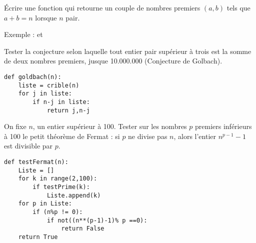\begin{Exercise}
Écrire une fonction  qui retourne un couple de nombres premiers $(a,b)$ tels que $a+b=n$ lorsque $n$ pair. %

Exemple  :   et 

Tester la conjecture selon laquelle tout entier pair supérieur à trois est la somme de deux nombres premiers, jusque 10.000.000 (Conjecture de Golbach). 
\end{Exercise}
\begin{Answer}
\begin{lstlisting}
def goldbach(n):
    liste = crible(n)
    for j in liste:
        if n-j in liste:
            return j,n-j
\end{lstlisting}
\end{Answer}
\begin{Exercise}
On fixe $n$, un entier supérieur à 100. 
Tester sur les nombres $p$ premiers inférieurs à 100 le petit théorème de Fermat : si $p$ ne divise pas $n$, alors  l'entier $ n^{p-1}-1$ est divisible par $p$.
\end{Exercise}
\begin{Answer}
\begin{lstlisting}
def testFermat(n):
    Liste = []
    for k in range(2,100):
        if testPrime(k):
            Liste.append(k)
    for p in Liste:
        if (n%p != 0):
            if not((n**(p-1)-1)% p ==0):
                return False
    return True

\end{lstlisting}
\end{Answer}
